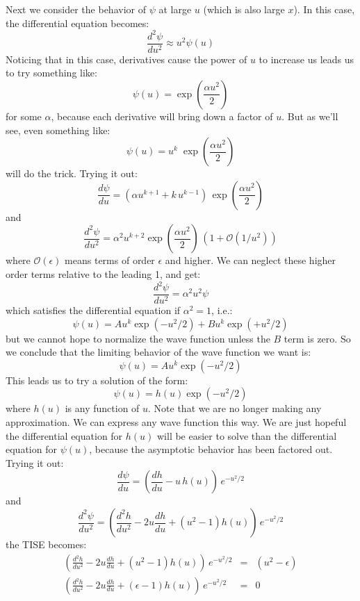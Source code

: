 \documentclass[12pt]{book}
\begin{document}
Next we consider the behavior of $\psi$ at large $u$ (which is also large $x$).  In this case, the differential equation becomes:
\begin{equation*}
\frac{d^2 \psi}{d u^2}  \approx u^2 \psi(u) 
\end{equation*}
Noticing that in this case, derivatives cause the power of $u$ to increase us leads us to try something like:
\begin{equation*}
\psi(u) = \exp\left(\frac{\alpha u^2}{2}\right)
\end{equation*}
for some $\alpha$, because each derivative will bring down a factor of $u$.  But as we'll see, even something like:
\begin{equation*}
\psi(u) = u^k \; \exp\left(\frac{\alpha u^2}{2}\right)
\end{equation*}
will do the trick.  Trying it out:
$$\frac{d \psi}{d u}  = \left(\alpha u^{k+1} + k\,u^{k-1}\right) \, \exp\left(\frac{\alpha u^2}{2}\right) $$
and
$$\frac{d^2 \psi}{d u^2}  = \alpha^2 u^{k+2} \exp\left(\frac{\alpha u^2}{2}\right) \, \left(1 + \mathcal{O}(1/u^2)\right)$$
where $\mathcal{O}(\epsilon)$ means terms of order $\epsilon$ and higher.  We can neglect these higher order terms relative to the leading 1, and get:
$$\frac{d^2 \psi}{d u^2}  = \alpha^2 u^2 \psi$$
which satisfies the differential equation if $\alpha^2 = 1$, i.e.:
$$\psi(u) = A u^k \exp(-u^2/2) + B u^k \exp(+u^2/2)$$
but we cannot hope to normalize the wave function unless the $B$ term is zero.  So we conclude that the limiting behavior of the wave function we want is:
$$\psi(u) = A u^k \exp(-u^2/2)$$
This leads us to try a solution of the form:
$$\psi(u) = h(u) \exp(-u^2/2)$$
where $h(u)$ is any function of $u$.  Note that we are no longer making any approximation.  We can express any wave function this way.  We are just hopeful the differential equation for $h(u)$ will be easier to solve than the differential equation for $\psi(u)$, because the asymptotic behavior has been factored out.  Trying it out:
$$\frac{d\psi}{du} = \left( \frac{dh}{du} - u\, h(u)\right) \, e^{-u^2/2}$$
and
$$\frac{d^2\psi}{du^2} = \left( \frac{d^2h}{du^2} - 2 u \frac{dh}{du} + (u^2-1)h(u) \right) \, e^{-u^2/2}$$
the TISE becomes:
\begin{eqnarray*}
\left( \frac{d^2h}{du^2} - 2 u \frac{dh}{du} + (u^2-1)h(u) \right) \, e^{-u^2/2} &=& (u^2-\epsilon)\\[7pt] 
\left( \frac{d^2h}{du^2} - 2 u \frac{dh}{du} + (\epsilon-1)h(u) \right) \, e^{-u^2/2} &=& 0\\
\end{eqnarray*}
\end{document}
